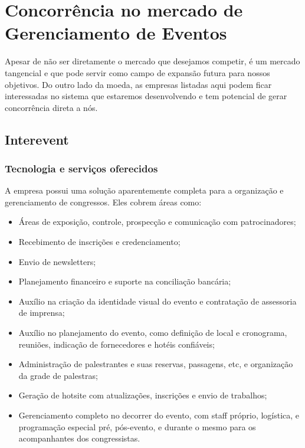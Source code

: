 \documentclass[12pt,a4paper,twoside,hyphens,english,brazil]{abntex2}
\begin{document}
\section{Concorrência no mercado de Gerenciamento de Eventos} \label{sec:sistemas:gerenciamento}
Apesar de não ser diretamente o mercado que desejamos competir, é um mercado tangencial e que pode servir como campo de expansão futura para nossos objetivos. Do outro lado da moeda, as empresas listadas aqui podem ficar interessadas no sistema que estaremos desenvolvendo e tem potencial de gerar concorrência direta a nós.

\subsection{Interevent}
\subsubsection*{Tecnologia e serviços oferecidos}
A empresa possui uma solução aparentemente completa para a organização e gerenciamento de congressos. Eles cobrem áreas como:
\begin{itemize}[itemsep=-1ex]
	\item Áreas de exposição, controle, prospecção e comunicação com patrocinadores;
	\item Recebimento de inscrições e credenciamento;
	\item Envio de newsletters;
	\item Planejamento financeiro e suporte na conciliação bancária;
	\item Auxílio na criação da identidade visual do evento e contratação de assessoria de imprensa;
	\item Auxílio no planejamento do evento, como definição de local e cronograma, reuniões, indicação de fornecedores e hotéis confiáveis;
	\item Administração de palestrantes e suas reservas, passagens, etc, e organização da grade de palestras;
	\item Geração de hotsite com atualizações, inscrições e envio de trabalhos;
	\item Gerenciamento completo no decorrer do evento, com staff próprio, logística, e programação especial pré, pós-evento, e durante o mesmo para os acompanhantes dos congressistas.
\end{itemize}
\end{document}
